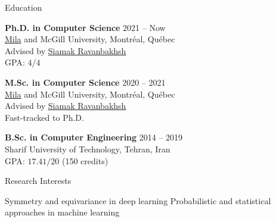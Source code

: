 \documentclass{resume}
\newcommand{\InternalSpace}{\vspace{0.18cm}}
\newenvironment{MySection}[1]
{\begin{category}{#1}}
{\end{category}}
\newcommand{\MyItem}{\citembullet}
\def \Siamak {\href{https://www.siamak.page}{Siamak Ravanbakhsh}}
\begin{document}
\maketitle

\vspace{-0.75cm}

\InternalSpace
\InternalSpace



\begin{MySection}{Education}

\MyItem
\textbf{Ph.D. in Computer Science} \hfill{ 2021 -- Now }\\
\href{https://mila.quebec/en/}{Mila} and McGill University, Montréal, Québec\\
Advised by \Siamak\\
\textsc{GPA}: $4/4$

\MyItem
\textbf{M.Sc. in Computer Science} \hfill{ 2020 -- 2021 }\\
\href{https://mila.quebec/en/}{Mila} and McGill University, Montréal, Québec\\
Advised by \Siamak\\
Fast-tracked to Ph.D.

\MyItem
\textbf{B.Sc. in Computer Engineering} \hfill{ 2014 -- 2019 }\\
Sharif University of Technology, Tehran, Iran\\
\textsc{GPA}: $17.41/20$ (150 credits)\\

\end{MySection}

\InternalSpace



\begin{MySection}{Research Interests}


\MyItem Symmetry and equivariance in deep learning
\MyItem Probabilistic and statistical approaches in machine learning

\end{MySection}

\InternalSpace


\end{document}
